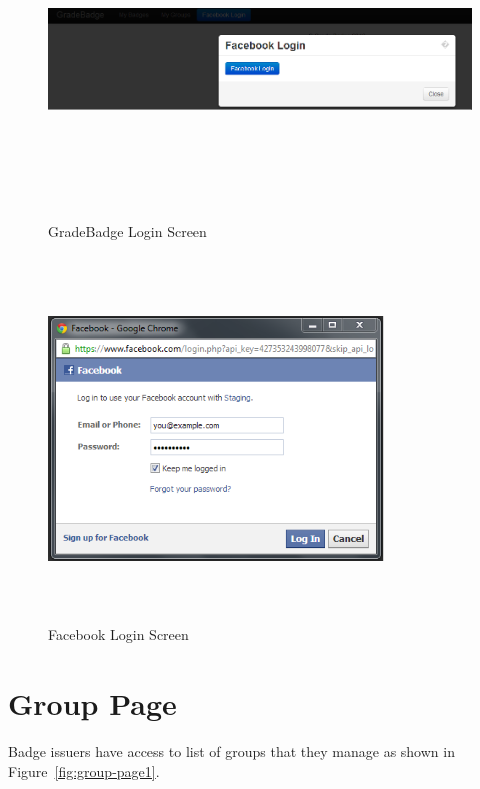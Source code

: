 \vspace{3em}
\begin{figure}[H]
\begin{center}
\includegraphics[height=3.3in,width=6.5in]{images/facebook-login.jpg}
\caption{GradeBadge Login Screen}
\label{fig:login_screen}
\end{center}
\end{figure}

\vspace{3em}
\begin{figure}[H]
\begin{center}
\includegraphics[height=3.8in,width=3.5in]{images/facebook-login1.jpg}
\caption{Facebook Login Screen}
\label{fig:fb_login_screen}
\end{center}
\end{figure}

\newpage
\section{Group Page}
 Badge issuers have access to list of groups that they manage as shown in Figure~\ref{fig:group-page1}. 

